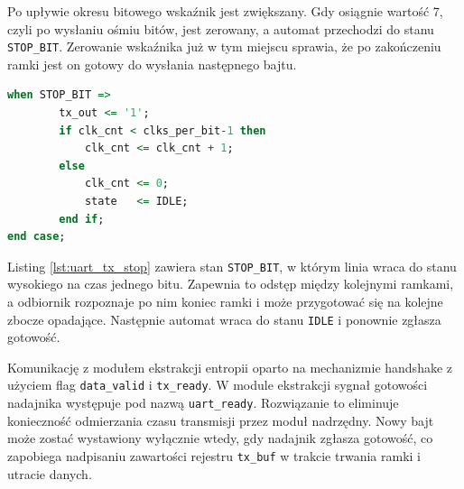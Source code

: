 Po upływie okresu bitowego wskaźnik jest zwiększany. Gdy osiągnie wartość 7,
czyli po wysłaniu ośmiu bitów, jest zerowany, a automat przechodzi do stanu
\texttt{STOP\_BIT}. Zerowanie wskaźnika już w tym miejscu sprawia, że po
zakończeniu ramki jest on gotowy do wysłania następnego bajtu.

\begin{lstlisting}[language=VHDL,
caption={Stan STOP\_BIT automatu UART TX (uart\_tx.vhdl)},
label={lst:uart_tx_stop}]
    when STOP_BIT =>
        tx_out <= '1';
        if clk_cnt < clks_per_bit-1 then
            clk_cnt <= clk_cnt + 1;
        else
            clk_cnt <= 0;
            state   <= IDLE;
        end if;
end case;
\end{lstlisting}

Listing \ref{lst:uart_tx_stop} zawiera stan \texttt{STOP\_BIT}, w którym linia
wraca do stanu wysokiego na czas jednego bitu. Zapewnia to odstęp między
kolejnymi ramkami, a odbiornik rozpoznaje po nim koniec ramki i może
przygotować się na kolejne zbocze opadające. Następnie automat wraca do stanu
\texttt{IDLE} i ponownie zgłasza gotowość.

Komunikację z modułem ekstrakcji entropii oparto na mechanizmie handshake
z użyciem flag \texttt{data\_valid} i \texttt{tx\_ready}. W module ekstrakcji
sygnał gotowości nadajnika występuje pod nazwą \texttt{uart\_ready}.
Rozwiązanie to eliminuje konieczność odmierzania czasu transmisji przez moduł
nadrzędny. Nowy bajt może zostać wystawiony wyłącznie wtedy, gdy nadajnik
zgłasza gotowość, co zapobiega nadpisaniu zawartości rejestru \texttt{tx\_buf}
w trakcie trwania ramki i utracie danych.